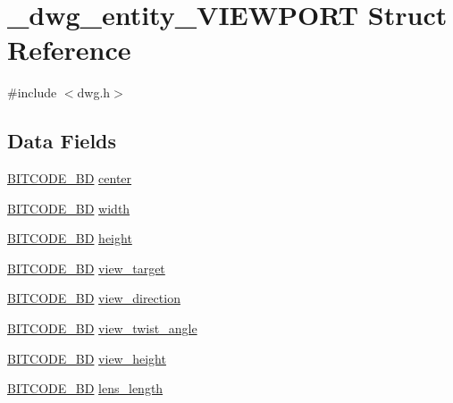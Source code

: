 \hypertarget{struct__dwg__entity__VIEWPORT}{\section{\-\_\-dwg\-\_\-entity\-\_\-\-V\-I\-E\-W\-P\-O\-R\-T \-Struct \-Reference}
\label{struct__dwg__entity__VIEWPORT}
}


{\ttfamily \#include $<$dwg.\-h$>$}

\subsection*{\-Data \-Fields}
\begin{DoxyCompactItemize}
\item 
\hyperlink{dwg_8h_a00698ef1bb072aa0a9360c6fc1c57587}{\-B\-I\-T\-C\-O\-D\-E\-\_\-B\-D} \hyperlink{struct__dwg__entity__VIEWPORT_a52b84707aec2886b5686b6d6d15fec0b}{center}
\item 
\hyperlink{dwg_8h_a3c1e6781466b74ba07785d57da70ed97}{\-B\-I\-T\-C\-O\-D\-E\-\_\-\-B\-D} \hyperlink{struct__dwg__entity__VIEWPORT_aef61c86ae86d5d3608557b0b12a4a2b4}{width}
\item 
\hyperlink{dwg_8h_a3c1e6781466b74ba07785d57da70ed97}{\-B\-I\-T\-C\-O\-D\-E\-\_\-\-B\-D} \hyperlink{struct__dwg__entity__VIEWPORT_aae379d941a0782ada33faf1c45252be1}{height}
\item 
\hyperlink{dwg_8h_a00698ef1bb072aa0a9360c6fc1c57587}{\-B\-I\-T\-C\-O\-D\-E\-\_\-B\-D} \hyperlink{struct__dwg__entity__VIEWPORT_a5bc14371c9f1961ea78845c947922e27}{view\-\_\-target}
\item 
\hyperlink{dwg_8h_a00698ef1bb072aa0a9360c6fc1c57587}{\-B\-I\-T\-C\-O\-D\-E\-\_\-B\-D} \hyperlink{struct__dwg__entity__VIEWPORT_a80f3c788c129e462bdb02edb0ad15648}{view\-\_\-direction}
\item 
\hyperlink{dwg_8h_a3c1e6781466b74ba07785d57da70ed97}{\-B\-I\-T\-C\-O\-D\-E\-\_\-\-B\-D} \hyperlink{struct__dwg__entity__VIEWPORT_a177ffdceb18183a5f05ea793e60fd5b8}{view\-\_\-twist\-\_\-angle}
\item 
\hyperlink{dwg_8h_a3c1e6781466b74ba07785d57da70ed97}{\-B\-I\-T\-C\-O\-D\-E\-\_\-\-B\-D} \hyperlink{struct__dwg__entity__VIEWPORT_aad94f7feb8feec371758d10693702984}{view\-\_\-height}
\item 
\hyperlink{dwg_8h_a3c1e6781466b74ba07785d57da70ed97}{\-B\-I\-T\-C\-O\-D\-E\-\_\-\-B\-D} \hyperlink{struct__dwg__entity__VIEWPORT_a7743c06422aec99109af8fe62545ad7f}{lens\-\_\-length}

\end{DoxyCompactItemize}
